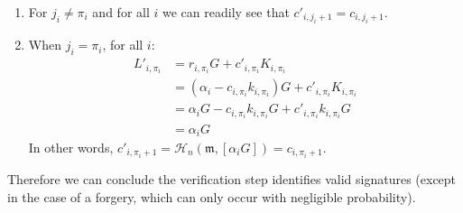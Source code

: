 \begin{enumerate}
	\item For \(j_i \ne \pi_i\) and for all \(i\) we can readily see that \(c'_{i, j_i+1} = c_{i, j_i+1}\).
	
	\item When \(j_i = \pi_i\), for all \(i \):
	\begin{align*}
	L'_{i, \pi_i} &= r_{i, \pi_i} G + c'_{i, \pi_i} K_{i, \pi_i} \\
	              &= (\alpha_i - c_{i, \pi_i} k_{i, \pi_i}) G + c'_{i, \pi_i} K_{i, \pi_i} \\
	              &= \alpha_i G - c_{i, \pi_{i}} k_{i, \pi_i} G + c'_{i, \pi_i} k_{i, \pi_i} G \\
	              &= \alpha_i G 
	\end{align*}
	In other words, \(c'_{i, \pi_i+1} = \mathcal{H}_n(\mathfrak{m}, [\alpha_i G]) = c_{i, \pi_i+1}\).
	
\end{enumerate}

Therefore we can conclude the verification step identifies valid signatures (except in the case of a forgery, which can only occur with negligible probability).

